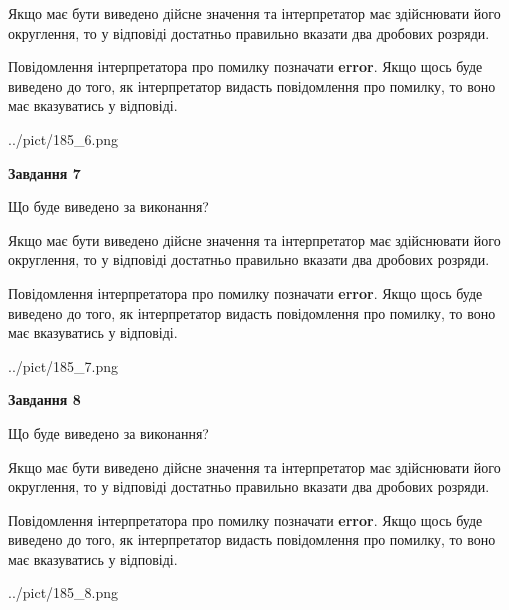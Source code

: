 \documentclass[12pt, ukrainian]{article}
\begin{document}
{\begin {Large}
Якщо має бути виведено дійсне значення та інтерпретатор має здійснювати його округлення, 
то у відповіді достатньо правильно вказати два дробових розряди.

Повідомлення інтерпретатора про помилку позначати \textbf{error}.
Якщо щось буде виведено до того, як інтерпретатор видасть повідомлення про помилку, 
то воно має вказуватись у відповіді. \par

\begin{center}
	{../pict/185_6.png}
\end{center}
\newpage

{\begin {center}\textbf{Завдання 7}\end {center}}\par
Що буде виведено за виконання? \par

Якщо має бути виведено дійсне значення та інтерпретатор має здійснювати його округлення, 
то у відповіді достатньо правильно вказати два дробових розряди.

Повідомлення інтерпретатора про помилку позначати \textbf{error}.
Якщо щось буде виведено до того, як інтерпретатор видасть повідомлення про помилку, 
то воно має вказуватись у відповіді. \par

\begin{center}
	{../pict/185_7.png}
\end{center}
\newpage

{\begin {center}\textbf{Завдання 8}\end {center}}\par
Що буде виведено за виконання? \par

Якщо має бути виведено дійсне значення та інтерпретатор має здійснювати його округлення, 
то у відповіді достатньо правильно вказати два дробових розряди.

Повідомлення інтерпретатора про помилку позначати \textbf{error}.
Якщо щось буде виведено до того, як інтерпретатор видасть повідомлення про помилку, 
то воно має вказуватись у відповіді. \par

\begin{center}
	{../pict/185_8.png}
\end{center}
\newpage


\end{Large}}
\end{document}
